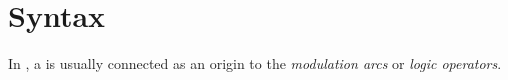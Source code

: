 \section{Syntax}

In \SBGNAFLone, a  is usually connected as an origin to the \emph{modulation arcs} or \emph{logic operators}.
